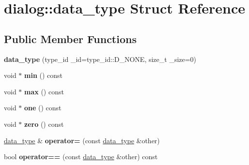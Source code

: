 \hypertarget{structdialog_1_1data__type}{}\section{dialog\+:\+:data\+\_\+type Struct Reference}
\label{structdialog_1_1data__type}
\subsection*{Public Member Functions}
\begin{DoxyCompactItemize}
\item 
\mbox{\label{structdialog_1_1data__type_acfccb37a96a912023a361474d0a91886}} 
{\bfseries data\+\_\+type} (type\+\_\+id \+\_\+id=type\+\_\+id\+::\+D\+\_\+\+N\+O\+NE, size\+\_\+t \+\_\+size=0)
\item 
\mbox{\label{structdialog_1_1data__type_a52915d9d5b5f170250104b907ebfd3aa}} 
void $\ast$ {\bfseries min} () const
\item 
\mbox{\label{structdialog_1_1data__type_a5a36e3b7eab5a53b462c8186ffb14413}} 
void $\ast$ {\bfseries max} () const
\item 
\mbox{\label{structdialog_1_1data__type_a1fb5308cb864cc1c6de1890bb76683f3}} 
void $\ast$ {\bfseries one} () const
\item 
\mbox{\label{structdialog_1_1data__type_afc18fbb61b17d9f2d436e5e91a16be63}} 
void $\ast$ {\bfseries zero} () const
\item 
\mbox{\label{structdialog_1_1data__type_a4f1f9514f927ccef44d0326ed8108f6c}} 
\hyperlink{structdialog_1_1data__type}{data\+\_\+type} \& {\bfseries operator=} (const \hyperlink{structdialog_1_1data__type}{data\+\_\+type} \&other)
\item 
\mbox{\label{structdialog_1_1data__type_a8af26c0fb43a080dda1d08772b3c1c4d}} 
bool {\bfseries operator==} (const \hyperlink{structdialog_1_1data__type}{data\+\_\+type} \&other) const
\item 
\mbox{\label{structdialog_1_1data__type_a39f84bb75dfe8a227015fa2735fe8d42}} 

\end{DoxyCompactItemize}

